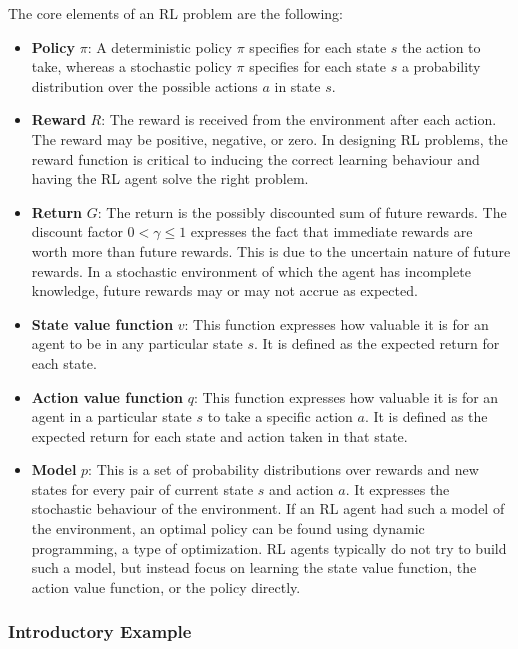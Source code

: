 The core elements of an RL problem are the following:

\begin{itemize}
    \item \textbf{Policy} $\pi$: A deterministic policy $\pi$ specifies for each state $s$ the action to take, whereas a stochastic policy $\pi$ specifies for each state $s$  a probability distribution over the possible actions $a$ in state $s$.
    \item \textbf{Reward} $R$: The reward is received from the environment after each action. The reward may be positive, negative, or zero. In designing RL problems, the reward function is critical to inducing the correct learning behaviour and having the RL agent solve the right problem. 
    \item \textbf{Return} $G$: The return is the possibly discounted sum of future rewards. The discount factor $0 < \gamma \leq 1$ expresses the fact that immediate rewards are worth more than future rewards. This is due to the uncertain nature of future rewards. In a stochastic environment of which the agent has incomplete knowledge, future rewards may or may not accrue as expected.
    \item \textbf{State value function} $v$: This function expresses how valuable it is for an agent to be in any particular state $s$. It is defined as the expected return for each state.
    \item \textbf{Action value function} $q$: This function expresses how valuable it is for an agent in a particular state $s$ to take a specific action $a$. It is defined as the expected return for each state and action taken in that state.
    \item \textbf{Model} $p$: This is a set of probability distributions over rewards and new states for every pair of current state $s$ and action $a$. It expresses the stochastic behaviour of the environment. If an RL agent had such a model of the environment, an optimal policy can be found using dynamic programming, a type of optimization. RL agents typically do not try to build such a model, but instead focus on learning the state value function, the action value function, or the policy directly.
\end{itemize}

\subsubsection*{Introductory Example}

